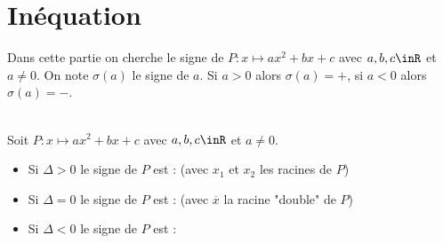 \documentclass[12pt,fleqn]{report} %
\begin{document}
\section{Inéquation}
\vspace{30pt}
Dans cette partie on cherche le signe de $P : x \mapsto a x^2 + bx + c$ avec $a,b,c \inR$ et $a \neq 0$. On note $\sigma(a)$ le signe de $a$. Si $a>0$ alors $\sigma(a) = +$, si $a<0$ alors $\sigma(a) = -$.

\begin{theorem}\text{ }\\
	Soit $P : x \mapsto a x^2 + bx + c$ avec $a,b,c \inR$ et $a \neq 0$.
	\begin{itemize}
		\item Si $\Delta >0$ le signe de $P$ est : (avec $x_1$ et $x_2$ les racines de $P$)
		\begin{center}
		\end{center}
		\item Si $\Delta = 0$ le signe de $P$ est : (avec $\overline{x}$ la racine "double" de $P$)
		\begin{center}
		\end{center}
		\item Si $\Delta <0$ le signe de $P$ est :
		\begin{center}
		\end{center}
	\end{itemize}
\end{theorem}
\end{document}
